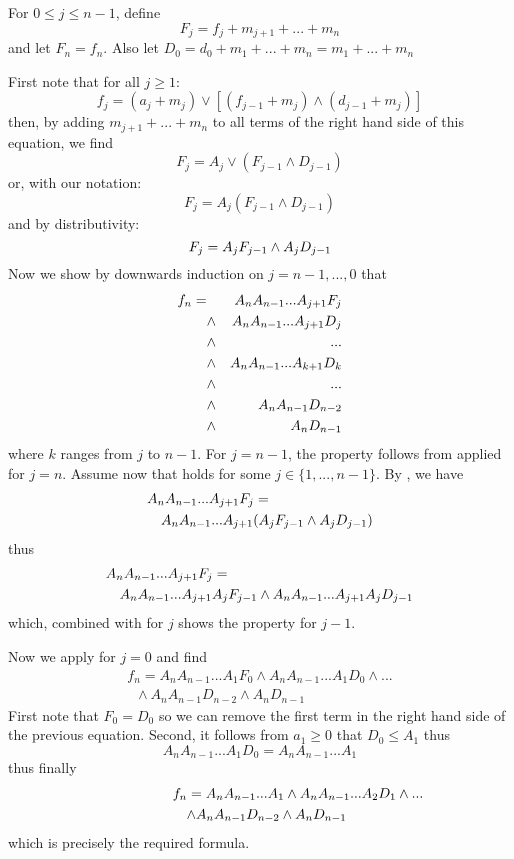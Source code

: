 For $0 \leq j\leq n-1$, define
$$F_j=f_j + m_{j+1} + ... + m_n
$$
and let $F_n=f_n$. Also let $D_0=d_0 + m_1 + ...+ m_n = m_1 +
...+ m_n$

First note that for all $j \geq 1$:
$$
f_j = \left(a_j + m_j \right) \vee \left[\left(f_{j-1} + m_j
\right) \wedge \left(d_{j-1} + m_j \right)  \right]
$$
then, by adding $m_{j+1}+...+m_n$ to all terms of the right
hand side of this equation, we find
$$
F_j = A_j \vee (F_{j-1} \wedge D_{j-1})
$$
or, with our notation:
$$
F_j = A_j   \left(F_{j-1} \wedge D_{j-1}\right)
$$
and by distributivity:
\begin{equation}\mylabel{eq-maxpluspsrg22}
  F_j = A_j F_{j-1} \wedge A_j D_{j-1}
\end{equation}
Now we show by downwards induction on $j= n-1, ...,0$ that
\begin{eqnarray}
  f_n  =  & \; & A_n A_{n-1} ... A_{j+1}F_j \nonumber \\
  &   \wedge & A_n A_{n-1} ... A_{j+1}D_j \nonumber \\
  &  \wedge & ...\nonumber \\
  &  \wedge &A_n A_{n-1} ... A_{k+1} D_k  \nonumber \\
  &  \wedge & ...\nonumber \\
  &  \wedge & A_n A_{n-1} D_{n-2} \nonumber \\
  &  \wedge & A_n D_{n-1} \mylabel{eq-maxplusleme1}
\end{eqnarray}
where $k$ ranges from $j$ to $n-1$. For $j=n-1$, the property
follows from  applied for $j=n$. Assume
now that  holds for some $j \in \{1,
..., n-1\}$. By , we have
\begin{eqnarray*}
\lefteqn{ A_n A_{n-1} ... A_{j+1}F_j = }\\ & & A_n A_{n-1} ...
A_{j+1} (A_j F_{j-1} \wedge A_j D_{j-1} )
\end{eqnarray*}
thus
\begin{eqnarray*}
\lefteqn{ A_n A_{n-1} ... A_{j+1}F_j =} \\
 & & A_n A_{n-1} ... A_{j+1}
A_j F_{j-1} \wedge A_n A_{n-1} ... A_{j+1}  A_j D_{j-1}
\end{eqnarray*}
which, combined with  for $j$ shows the
property for $j-1$.

Now we apply  for $j=0$ and find
$$
  \begin{array}{l}
   f_n= A_n A_{n-1} ... A_{1}F_0  \wedge A_n A_{n-1} ... A_{1}
  D_0 \wedge ... \\
   \;\; \wedge A_n A_{n-1} D_{n-2} \wedge A_n D_{n-1}
  \end{array}
$$
First note that $F_0=D_0$ so we can remove the first term in
the right hand side of the previous equation. Second, it
follows from $a_1 \geq 0$ that $D_0 \leq A_1$ thus
$$A_n A_{n-1} ... A_{1}  D_0 = A_n A_{n-1} ... A_{1}$$
thus finally
\begin{eqnarray*}
\lefteqn{ f_n = A_n A_{n-1} ... A_{1}\wedge A_n A_{n-1} ...
A_{2}
  D_1 \wedge  ... }\\
  & & \wedge A_n A_{n-1} D_{n-2}
\wedge A_n D_{n-1}
\end{eqnarray*}
which is precisely the required formula.
